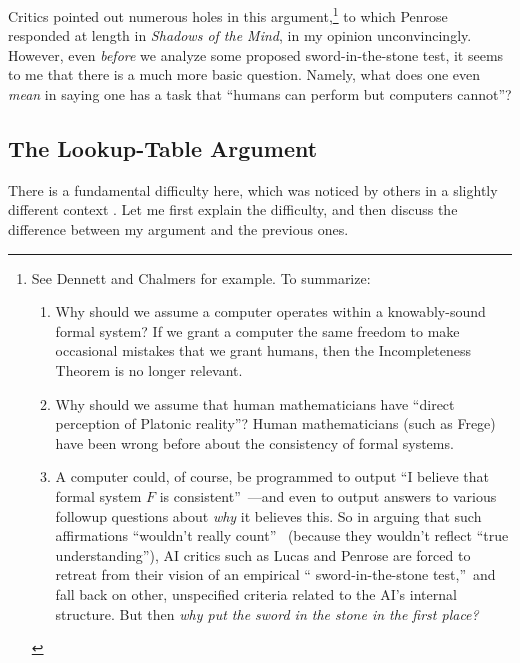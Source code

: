 \documentclass[12pt,onecolumn]{article}%
\begin{document}
Critics pointed out numerous holes in this argument,\footnote{See Dennett
\cite{dennett} and Chalmers \cite{chalmers} for example. To summarize:
\par
\begin{enumerate}
\item[(1)] Why should we assume a computer operates within a knowably-sound
formal system? If we grant a computer the same freedom to make occasional
mistakes that we grant humans, then the Incompleteness Theorem is no longer
relevant.
\par
\item[(2)] Why should we assume that human mathematicians have
\textquotedblleft direct perception of Platonic reality\textquotedblright ?
 Human mathematicians (such as Frege) have been wrong before about the
consistency of formal systems.
\par
\item[(3)] A computer could, of course, be programmed to output
\textquotedblleft I believe that formal system $F$ is
consistent\textquotedblright\ ---and even to output answers to various followup
questions about \textit{why} it believes this. So in arguing that such
affirmations \textquotedblleft wouldn't really count\textquotedblright\ %
 (because they wouldn't reflect \textquotedblleft true
understanding\textquotedblright ), AI critics such as Lucas and Penrose are
forced to retreat from their vision of an empirical \textquotedblleft
sword-in-the-stone test,\textquotedblright\  and fall back on other,
unspecified criteria related to the AI's internal structure. But then
\textit{why put the sword in the stone in the first place?}
\end{enumerate}
} to which Penrose responded at length in \textit{Shadows of the Mind}, in my
opinion unconvincingly. However, even \textit{before} we analyze some
proposed sword-in-the-stone test, it seems to me that there is a much more
basic question. Namely, what does one even \textit{mean} in saying one has a
task that \textquotedblleft humans can perform but computers
cannot\textquotedblright ?

\subsection{The Lookup-Table Argument\label{LOOKUP}}

There is a fundamental difficulty here, which was noticed by others in a
slightly different context \cite{block,parberry,levesque,shieber}. Let me
first explain the difficulty, and then discuss the difference between my
argument and the previous ones.
\end{document}
